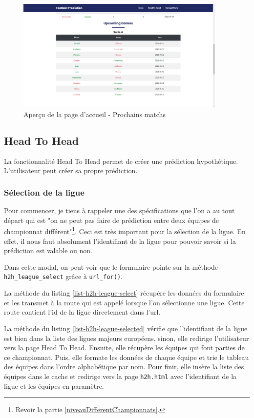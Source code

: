 \documentclass[a4paper,14pt]{extarticle}
\begin{document}
{\begin{figure}[htp]
    \centering
    \includegraphics[width=28em]{../img/upcomingGamesAccueil.png}
    \caption{Aperçu de la page d'accueil - Prochains matchs}
    \label{fig:upcomingGamesAccueil}
\end{figure}

\subsection{Head To Head}

La fonctionnalité Head To Head permet de créer une prédiction hypothétique. L'utilisateur peut créer sa propre prédiction.

\subsubsection{Sélection de la ligue}

Pour commencer, je tiens à rappeler une des spécifications que l'on a au tout départ qui est "on ne peut pas faire de prédiction entre deux équipes de championnat différent"\footnote{Revoir la partie \ref{niveauDifferentChampionnats}.}. Ceci est très important pour la sélection de la ligue. En effet, il nous faut absolument l'identifiant de la ligue pour pouvoir savoir si la prédiction est valable ou non.


Dans cette modal, on peut voir que le formulaire pointe sur la méthode \texttt{h2h\_league\_select} grâce à \texttt{url\_for()}. 

La méthode du listing \ref{list-h2h-league-select} récupère les données du formulaire et les transmet à la route qui est appelé lorsque l'on sélectionne une ligue. Cette route contient l'id de la ligue directement dans l'url. 


La méthode du listing \ref{list-h2h-league-selected} vérifie que l'identifiant de la ligue est bien dans la liste des ligues majeurs européens, sinon, elle redirige l'utilisateur vers la page Head To Head. Ensuite, elle récupère les équipes qui font parties de ce championnat. Puis, elle formate les données de chaque équipe et trie le tableau des équipes dans l'ordre alphabétique par nom. Pour finir, elle insère la liste des équipes dans le cache et redirige vers la page \texttt{h2h.html} avec l'identifiant de la ligue et les équipes en paramètre.

}
\end{document}
